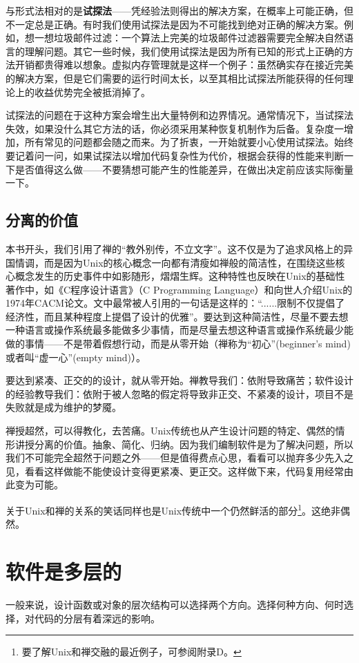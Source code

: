 \documentclass[12pt,oneside]{book}
\begin{document}
与形式法相对的是\textbf{试探法}——凭经验法则得出的解决方案，在概率上可能正确，但不一定总是正确。有时我们使用试探法是因为不可能找到绝对正确的解决方案。例如，想一想垃圾邮件过滤：一个算法上完美的垃圾邮件过滤器需要完全解决自然语言的理解问题。其它一些时候，我们使用试探法是因为所有已知的形式上正确的方法开销都贵得难以想象。虚拟内存管理就是这样一个例子：虽然确实存在接近完美的解决方案，但是它们需要的运行时间太长，以至其相比试探法所能获得的任何理论上的收益优势完全被抵消掉了。

试探法的问题在于这种方案会增生出大量特例和边界情况。通常情况下，当试探法失效，如果没什么其它方法的话，你必须采用某种恢复机制作为后备。复杂度一增加，所有常见的问题都会随之而来。为了折衷，一开始就要小心使用试探法。始终要记着问一问，如果试探法以增加代码复杂性为代价，根据会获得的性能来判断一下是否值得这么做——不要猜想可能产生的性能差异，在做出决定前应该实际衡量一下。

\subsection{分离的价值}
本书开头，我们引用了禅的“教外别传，不立文字”。这不仅是为了追求风格上的异国情调，而是因为Unix的核心概念一向都有清瘦如禅般的简洁性，在围绕这些核心概念发生的历史事件中如影随形，熠熠生辉。这种特性也反映在Unix的基础性著作中，如《C程序设计语言》（C Programming Language）\cite{Kernighan-Ritchie}和向世人介绍Unix的1974年CACM论文。文中最常被人引用的一句话是这样的：“......限制不仅提倡了经济性，而且某种程度上提倡了设计的优雅”。要达到这种简洁性，尽量不要去想一种语言或操作系统最多能做多少事情，而是尽量去想这种语言或操作系统最少能做的事情——不是带着假想行动，而是从零开始（禅称为“初心”(beginner's mind)或者叫“虚一心”(empty mind)）。

要达到紧凑、正交的的设计，就从零开始。禅教导我们：依附导致痛苦；软件设计的经验教导我们：依附于被人忽略的假定将导致非正交、不紧凑的设计，项目不是失败就是成为维护的梦魇。

禅授超然，可以得教化，去苦痛。Unix传统也从产生设计问题的特定、偶然的情形讲授分离的价值。抽象、简化、归纳。因为我们编制软件是为了解决问题，所以我们不可能完全超然于问题之外——但是值得费点心思，看看可以抛弃多少先入之见，看看这样做能不能使设计变得更紧凑、更正交。这样做下来，代码复用经常由此变为可能。

关于Unix和禅的关系的笑话同样也是Unix传统中一个仍然鲜活的部分\footnote{要了解Unix和禅交融的最近例子，可参阅附录D。}。这绝非偶然。


\section{软件是多层的}
一般来说，设计函数或对象的层次结构可以选择两个方向。选择何种方向、何时选择，对代码的分层有着深远的影响。
\end{document}
